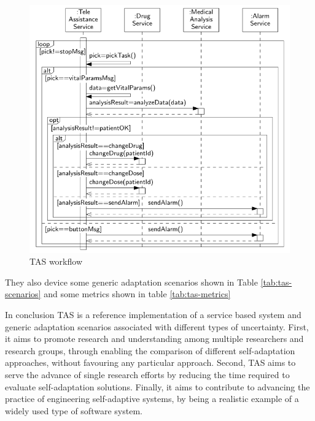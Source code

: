 \begin{figure}[ht]
	\centerline
	{\includegraphics[scale=0.55]{img/tas-workflow.png}}
	\caption[TAS workflow]{TAS workflow}
	\label{fig:tas-workflow}
\end{figure}

They also device some generic adaptation scenarios shown in Table \ref{tab:tas-scenarios} and some metrics shown in table \ref{tab:tas-metrics}

In conclusion TAS is a reference implementation of a service based system and generic adaptation scenarios associated with different types of uncertainty. First, it aims to promote research and understanding among multiple researchers and research groups, through enabling the comparison of different self-adaptation approaches, without favouring any particular approach. Second, TAS aims to serve the advance of single research efforts by reducing the time required to evaluate self-adaptation solutions. Finally, it aims to contribute to advancing the practice of engineering self-adaptive systems, by being a realistic example of a widely used type of software system.

